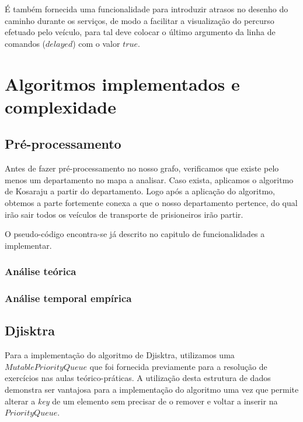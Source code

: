\documentclass[article, a4paper, 12pt, oneside]{memoir}
\begin{document}
É também fornecida uma funcionalidade para introduzir atrasos no desenho do caminho durante os serviços, de modo a facilitar a visualização do percurso efetuado pelo veículo, para tal deve colocar o último argumento da linha de comandos ($delayed$) com o valor $true$.


\newpage
\chapter[Algoritmos implementados e complexidade][Algoritmos implementados e complexidade]{Algoritmos implementados e complexidade} \label{\thechapter}

\section{Pré-processamento}
Antes de fazer pré-processamento no nosso grafo, verificamos que existe pelo menos um departamento no mapa a analisar.
Caso exista, aplicamos o algoritmo de Kosaraju a partir do departamento. Logo após a aplicação do algoritmo, 
obtemos a parte fortemente conexa a que o nosso departamento pertence, do qual irão sair todos os veículos de transporte de prisioneiros irão partir.

O pseudo-código encontra-se já descrito no capitulo de funcionalidades a implementar.
\subsection{Análise teórica}


\subsection{Análise temporal empírica}



\section{Djisktra}
Para a implementação do algoritmo de Djisktra, utilizamos uma $MutablePriorityQueue$ que foi fornecida previamente para a resolução de exercícios nas aulas teórico-práticas.
A utilização desta estrutura de dados demonstra ser vantajosa para a implementação do algoritmo uma vez que permite
alterar a \textit{key} de um elemento sem precisar de o remover e voltar a inserir na $PriorityQueue$.
\end{document}
